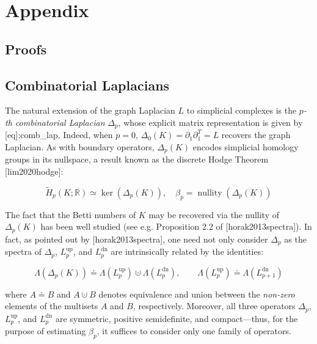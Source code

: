 \section{Appendix}\label{sec:appendix}

\subsection{Proofs}\label{sec:proofs}

\subsection{Combinatorial Laplacians}\label{sec:laplacian_theory}

The natural extension of the graph Laplacian \(L\) to simplicial complexes is the \emph{\(p\)-th combinatorial Laplacian} \(\Delta_{p}\), whose explicit matrix representation is given by {[}eq{]}:comb\_lap. Indeed, when \(p = 0\), \(\Delta_{0}(K) = \partial_{1}\partial_{1}^{T} = L\) recovers the graph Laplacian. As with boundary operators, \(\Delta_{p}(K)\) encodes simplicial homology groups in its nullspace, a result known as the discrete Hodge Theorem {[}lim2020hodge{]}:

\[{\widetilde{H}}_{p}\left( K;\mathbb{R} \right) \simeq \ker\left( \Delta_{p}(K) \right),\quad\beta_{p} = \operatorname{nullity}\left( \Delta_{p}(K) \right)\]

The fact that the Betti numbers of \(K\) may be recovered via the nullity of \(\Delta_{p}(K)\) has been well studied (see e.g. Proposition 2.2 of {[}horak2013spectra{]}). In fact, as pointed out by {[}horak2013spectra{]}, one need not only consider \(\Delta_{p}\) as the spectra of \(\Delta_{p}\), \(L_{p}^{\operatorname{up}}\), and \(L_{p}^{\operatorname{dn}}\) are intrinsically related by the identities:

\[\Lambda\left( \Delta_{p}(K) \right) \doteq \Lambda\left. \left( L_{p}^{\operatorname{up}} \right) \right. ⊍ \Lambda\left. \left( L_{p}^{\operatorname{dn}} \right) \right.,\quad\quad\Lambda\left. \left( L_{p}^{\operatorname{up}} \right) \right. \doteq \Lambda\left. \left( L_{p + 1}^{\operatorname{dn}} \right) \right.\]

where \(A \doteq B\) and \(A ⊍ B\) denotes equivalence and union between the \emph{non-zero} elements of the multisets \(A\) and \(B\), respectively. Moreover, all three operators \(\Delta_{p}\), \(L_{p}^{\operatorname{up}}\), and \(L_{p}^{\operatorname{dn}}\) are symmetric, positive semidefinite, and compact---thus, for the purpose of estimating \(\beta_{p}\), it suffices to consider only one family of operators.

